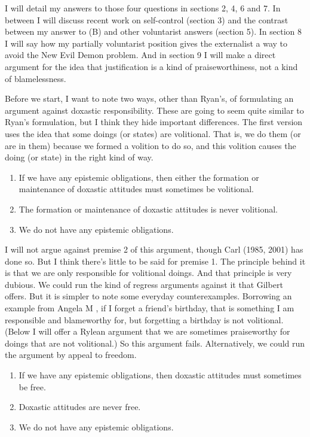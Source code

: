 I will detail my answers to those four questions in sections 2, 4, 6 and 7. In between I will discuss recent work on self-control (section 3) and the contrast between my answer to (B) and other voluntarist answers (section 5). In section 8 I will say how my partially voluntarist position gives the externalist a way to avoid the New Evil Demon problem. And in section 9 I will make a direct argument for the idea that justification is a kind of praiseworthiness, not a kind of blamelessness.

Before we start, I want to note two ways, other than Ryan's, of formulating an argument against doxastic responsibility. These are going to seem quite similar to Ryan's formulation, but I think they hide important differences. The first version uses the idea that some doings (or states) are volitional. That is, we do them (or are in them) because we formed a volition to do so, and this volition causes the doing (or state) in the right kind of way.

\begin{enumerate}
\item If we have any epistemic obligations, then either the formation or maintenance of doxastic attitudes must sometimes be volitional.
\item The formation or maintenance of doxastic attitudes is never volitional.
\item We do not have any epistemic obligations.
\end{enumerate}

\noindent I will not argue against premise 2 of this argument, though Carl \citet{Ginet1985, Ginet2001} (1985, 2001) has done so. But I think there's little to be said for premise 1. The principle behind it is that we are only responsible for volitional doings. And that principle is very dubious. We could run the kind of regress arguments against it that Gilbert \citet{Ryle1949} offers. But it is simpler to note some everyday counterexamples. Borrowing an example from Angela M \citet{AngelaSmith2005}, if I forget a friend's birthday, that is something I am responsible and blameworthy for, but forgetting a birthday is not volitional. (Below I will offer a Rylean argument that we are sometimes praiseworthy for doings that are not volitional.) So this argument fails. Alternatively, we could run the argument by appeal to freedom. 

\begin{enumerate}
\item If we have any epistemic obligations, then doxastic attitudes must sometimes be free.
\item Doxastic attitudes are never free.
\item We do not have any epistemic obligations.
\end{enumerate}

